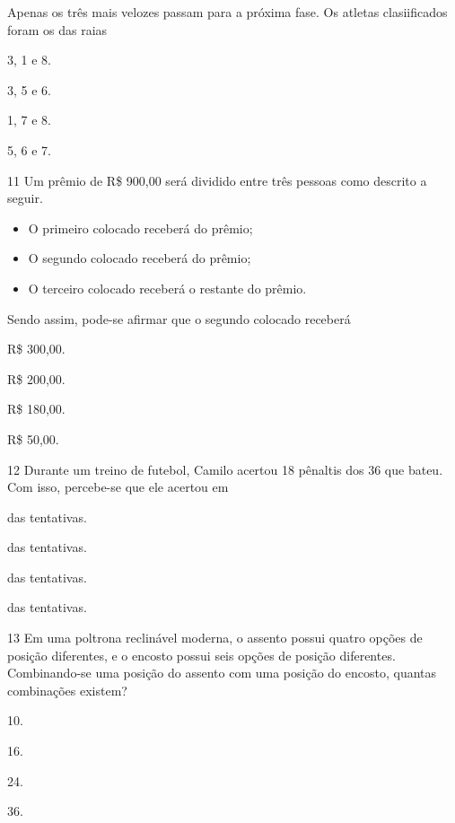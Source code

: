 \begin{mdframed}[linewidth=2pt,linecolor=salmao,roundcorner=2pt]
\begin{escolha}
{\begin{escolha}
Apenas os três mais velozes passam para a próxima fase. Os atletas clasiificados foram os das raias

\begin{escolha}
\item
  3, 1 e 8.
\item
  3, 5 e 6.
\item
  1, 7 e 8.
\item
  5, 6 e 7.
\end{escolha}


\num{11} Um prêmio de R\$ 900,00 será dividido entre três pessoas como descrito a seguir.

\begin{itemize}
\item
  O primeiro colocado receberá  do prêmio;
\item
  O segundo colocado receberá  do prêmio;
\item
  O terceiro colocado receberá o restante do prêmio.
\end{itemize}

Sendo assim, pode-se afirmar que o segundo colocado receberá

\begin{escolha}
\item
  R\$ 300,00.
\item
  R\$ 200,00.
\item
  R\$ 180,00.
\item
  R\$ 50,00.
\end{escolha}


\num{12} Durante um treino de futebol, Camilo acertou 18 pênaltis dos 36 que
bateu. Com isso, percebe-se que ele acertou em

\begin{escolha}
\item
   das tentativas.
\item
   das tentativas.
\item
   das tentativas.
\item
   das tentativas.
\end{escolha}


\num{13} Em uma poltrona reclinável moderna, o assento possui quatro opções de posição
diferentes, e o encosto possui seis opções de posição diferentes. Combinando-se uma posição do assento com uma posição do encosto, quantas combinações existem?

\begin{escolha}
\item
  10.
\item
  16.
\item
  24.
\item
  36.
\end{escolha}



\end{escolha}}
\end{escolha}
\end{mdframed}
